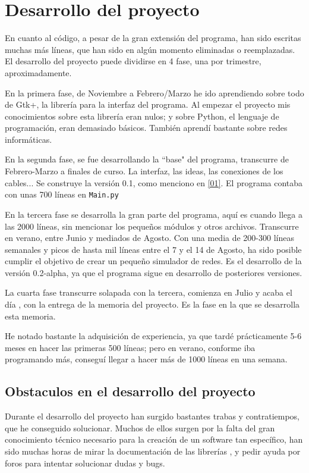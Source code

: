 \documentclass[a4paper, 11pt]{report} %
\begin{document}
\section{Desarrollo del proyecto}
En cuanto al código, a pesar de la gran extensión del programa, han sido escritas muchas más líneas, que han sido en algún momento eliminadas o reemplazadas. El desarrollo del proyecto puede dividirse en 4 fase, una por trimestre, aproximadamente.

En la primera fase, de Noviembre a Febrero/Marzo he ido aprendiendo sobre todo de Gtk+, la librería para la interfaz del programa. Al empezar el proyecto mis conocimientos sobre esta librería eran nulos; y sobre Python, el lenguaje de programación, eran demasiado básicos. También aprendí bastante sobre redes informáticas.

En la segunda fase, se fue desarrollando la ``base" del programa, transcurre de Febrero-Marzo a finales de curso. La interfaz, las ideas, las conexiones de los cables... Se construye la versión 0.1, como menciono en \ref{01}. El programa contaba con unas 700 líneas en \texttt{Main.py}

En la tercera fase se desarrolla la gran parte del programa, aquí es cuando llega a las 2000 líneas, sin mencionar los pequeños módulos y otros archivos. Transcurre en verano, entre Junio y mediados de Agosto. Con una media de 200-300 líneas semanales y picos de hasta mil líneas entre el 7 y el 14 de Agosto, ha sido posible cumplir el objetivo de crear un pequeño simulador de redes. Es el desarrollo de la versión 0.2-alpha, ya que el programa sigue en desarrollo de posteriores versiones.

La cuarta fase transcurre solapada con la tercera, comienza en Julio y acaba el día \@date, con la entrega de la memoria del proyecto. Es la fase en la que se desarrolla esta memoria.

He notado bastante la adquisición de experiencia, ya que tardé prácticamente 5-6 meses en hacer las primeras 500 líneas; pero en verano, conforme iba programando más, conseguí llegar a hacer más de 1000 líneas en una semana.

\subsection{Obstaculos en el desarrollo del proyecto}
Durante el desarrollo del proyecto han surgido bastantes trabas y contratiempos, que he conseguido solucionar. Muchos de ellos surgen por la falta del gran conocimiento técnico necesario para la creación de un software tan específico, han sido muchas horas de mirar la documentación de las librerías \cite{PyGiApi}, y pedir ayuda por foros para intentar solucionar dudas y bugs.
\end{document}
